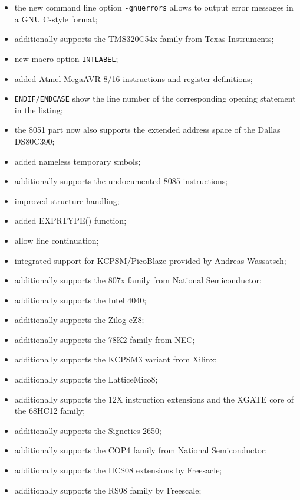 \documentclass[12pt,twoside]{report}
\begin{document}
\begin{itemize}
{\begin{itemize}
{            files;}
      \item{the new command line option {\tt -gnuerrors} allows to output
            error messages in a GNU C-style format;}
      \item{additionally supports the TMS320C54x family from Texas
            Instruments;}
      \item{new macro option {\tt INTLABEL};}
      \item{added Atmel MegaAVR 8/16 instructions and register
            definitions;}
      \item{{\tt ENDIF/ENDCASE} show the line number of the corresponding
            opening statement in the listing;}
      \item{the 8051 part now also supports the extended address space of
            the Dallas DS80C390;}
      \item{added nameless temporary smbols;}
      \item{additionally supports the undocumented 8085 instructions;}
      \item{improved structure handling;}
      \item{added EXPRTYPE() function;}
      \item{allow line continuation;}
      \item{integrated support for KCPSM/PicoBlaze provided by Andreas
            Wassatsch;}
      \item{additionally supports the 807x family from National
            Semiconductor;}
      \item{additionally supports the Intel 4040;}
      \item{additionally supports the Zilog eZ8;}
      \item{additionally supports the 78K2 family from NEC;}
      \item{additionally supports the KCPSM3 variant from Xilinx;}
      \item{additionally supports the LatticeMico8;}
      \item{additionally supports the 12X instruction extensions and the
            XGATE core of the 68HC12 family;}
      \item{additionally supports the Signetics 2650;}
      \item{additionally supports the COP4 family from National
            Semiconductor;}
      \item{additionally supports the HCS08 extensions by Freesacle;}
      \item{additionally supports the RS08 family by Freescale;}

\end{itemize}}
\end{itemize}
\end{document}
